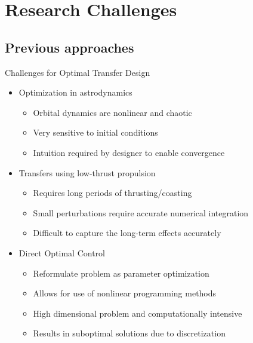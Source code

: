 
\section*{Research Challenges}
\subsection*{Previous approaches}

\begin{frame}{Challenges for Optimal Transfer Design} %

\begin{itemize}
    \item Optimization in astrodynamics
        \begin{itemize}
            \item Orbital dynamics are nonlinear and chaotic
            \item Very sensitive to initial conditions
            \item Intuition required by designer to enable convergence
        \end{itemize}
    \pause
    \item Transfers using low-thrust propulsion
        \begin{itemize}
            \item Requires long periods of thrusting/coasting
            \item Small perturbations require accurate numerical integration
            \item Difficult to capture the long-term effects accurately
        \end{itemize}
    \pause
    \item Direct Optimal Control
        \begin{itemize}
            \item Reformulate problem as parameter optimization
            \item Allows for use of nonlinear programming methods
            \item High dimensional problem and computationally intensive
            \item Results in suboptimal solutions due to discretization
        \end{itemize}
\end{itemize}
\end{frame}   %


